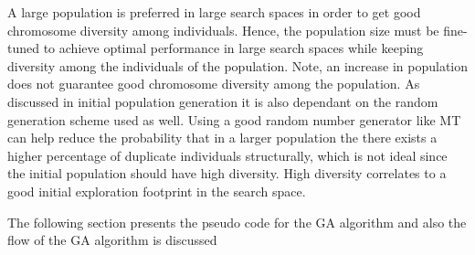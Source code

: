 A large population is preferred in large search spaces in order to get good chromosome diversity among individuals. Hence, the population size must be fine-tuned to achieve optimal performance in large search spaces while keeping diversity among the individuals of the population\cite{AdaptiveSAGA,CompuIntelligenceIntro}. Note, an increase in population does not guarantee good chromosome diversity among the population. As discussed in initial population generation it is also dependant on the random generation scheme used as well. Using a good random number generator like \gls{MT} can help reduce the probability that in a larger population the there exists a higher percentage of duplicate individuals structurally, which is not ideal since the initial population should have high diversity. High diversity correlates to a good initial exploration footprint in the search space.


The following section presents the pseudo code for the \gls{GA} algorithm and also the flow of the \gls{GA} algorithm is discussed
